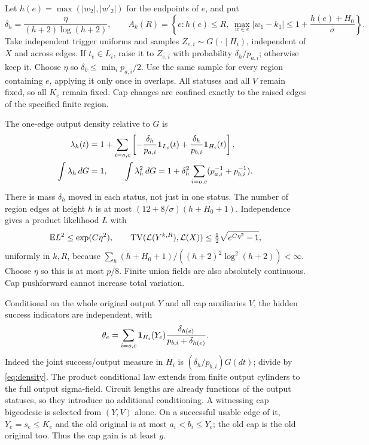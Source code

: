 Let $h(e)=\max(|w_2|,|w'_2|)$ for the endpoints of $e$, and put
\[
 \delta_h=\frac{\eta}{(h+2)\log(h+2)},\qquad
 A_k(R)=\left\{e:h(e)\le R,\ 
 \max_{w\in e}|w_1-k_1|\le1+\frac{h(e)+H_0}{\sigma}\right\}.
\]
Take independent trigger uniforms and samples $Z_{e,i}\sim G(\cdot\mid H_i)$,
independent of $X$ and across edges. If $t_e\in L_i$, raise it to $Z_{e,i}$
with probability $\delta_h/p_{a,i}$; otherwise keep it. Choose $\eta$ so
$\delta_0\le\min_i p_{a,i}/2$. Use the same sample for every region
containing $e$, applying it only once in overlaps. All statuses and all
$V$ remain fixed, so all $K_e$ remain fixed. Cap changes are confined
exactly to the raised edges of the specified finite region.

The one-edge output density relative to $G$ is
\begin{align}
 \lambda_h(t)&=1+\sum_{i=o,c}\left[-\frac{\delta_h}{p_{a,i}}\mathbf1_{L_i}(t)
                     +\frac{\delta_h}{p_{b,i}}\mathbf1_{H_i}(t)\right],\label{eq:density}\\
 \int\lambda_h\,dG&=1,\qquad
 \int\lambda_h^2\,dG=1+\delta_h^2\sum_{i=o,c}
                       (p_{a,i}^{-1}+p_{b,i}^{-1}).\nonumber
\end{align}
There is mass $\delta_h$ moved in each status, not just in one status.
The number of region edges at height $h$ is at most
$(12+8/\sigma)(h+H_0+1)$. Independence gives a product likelihood $L$ with
\[
 \mathbb E L^2\le\exp(C\eta^2),\qquad
 \operatorname{TV}(\mathcal L(Y^{k,R}),\mathcal L(X))
 \le\tfrac12\sqrt{e^{C\eta^2}-1},
\]
uniformly in $k,R$, because
$\sum_h(h+H_0+1)/((h+2)^2\log^2(h+2))<\infty$.
Choose $\eta$ so this is at most $p/8$. Finite union fields are also
absolutely continuous. Cap pushforward cannot increase total variation.

Conditional on the whole original output $Y$ and all cap auxiliaries $V$,
the hidden success indicators are independent, with
\begin{equation}\label{eq:posterior}
 \theta_e=\sum_{i=o,c}\mathbf1_{H_i}(Y_e)
                  \frac{\delta_{h(e)}}{p_{b,i}+\delta_{h(e)}}.
\end{equation}
Indeed the joint success/output measure in $H_i$ is
$(\delta_h/p_{b,i})G(dt)$; divide by \eqref{eq:density}. The product
conditional law extends from finite output cylinders to the full output
sigma-field. Circuit lengths are already functions of the output statuses,
so they introduce no additional conditioning. A witnessing cap bigeodesic
is selected from $(Y,V)$ alone. On a successful usable edge of it,
$Y_e=s_e\le K_e$ and the old original is at most $a_i<b_i\le Y_e$;
the old cap is the old original too. Thus the cap gain is at least $g$.

